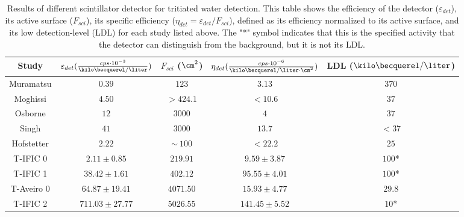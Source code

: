 \begin{table}[htbp]
\begin{center}
\begin{tabular}{|c|c|c|c|c|}
\hline
Study & \parbox{5.5em}{\centering $\varepsilon_{det}(\frac{cps \cdot{} 10^{-3}}{\kilo\becquerel/\liter})$}  & \parbox{4.5em}{\centering $F_{sci}$ ($\cm^2$)}  & \parbox{6.5em}{\centering $\eta_{det}(\frac{cps \cdot{} 10^{-6}}{\kilo\becquerel/ \liter \cdot{} \cm^2})$} & LDL ($\kilo\becquerel / \liter$)\\
\hline \hline \hline
Muramatsu & $0.39$ & $123$ & $3.13$ & $370$ \\ \hline
Moghissi & $4.50$ & $>424.1$ & $<10.6$ & $37$ \\\hline
Osborne & $12$ & $3000$ & $4$ & $37$ \\ \hline
Singh & $41$ & $3000$ & $13.7$ & $<37$ \\ \hline
Hofstetter & $2.22$ & $\sim~100$ & $<22.2$ & $25$ \\ \hline
T-IFIC 0 & $2.11 \pm 0.85$ & $219.91$ & $9.59 \pm 3.87$ & $100$* \\ \hline
T-IFIC 1 & $38.42 \pm 1.61$ & $402.12$ & $95.55 \pm 4.01$ & $100$* \\ \hline
T-Aveiro 0 & $64.87 \pm 19.41$ & $4071.50$ & $15.93 \pm 4.77$ & $29.8$ \\ \hline
T-IFIC 2 & $711.03 \pm 27.77$ & $5026.55$ & $141.45 \pm 5.52$ & $10$* \\ \hline
\end{tabular}
\caption{Results of different scintillator detector for tritiated water detection. This table shows the efficiency of the detector ($\varepsilon_{det}$), its active surface ($F_{sci}$), its specific efficiency ($\eta_{det}=\varepsilon_{det}/F_{sci}$), defined as its efficiency normalized to its active surface, and its low detection-level (LDL) for each study listed above. The "*" symbol indicates that this is the specified activity that the detector can distinguish from the background, but it is not its LDL.}
\label{tab:ComparisonResults}
\end{center}
\end{table}